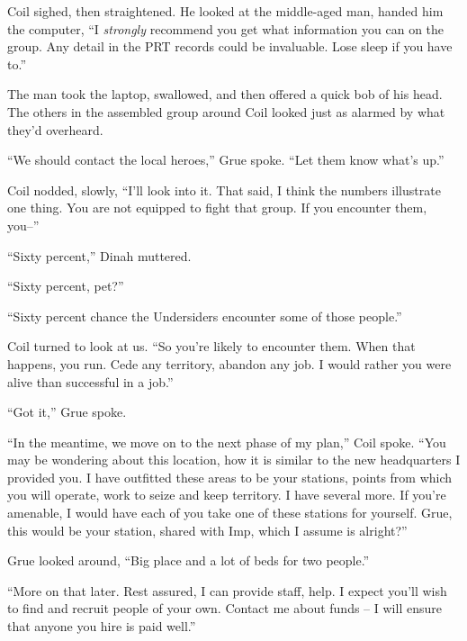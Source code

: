 Coil sighed, then straightened.  He looked at the middle-aged man, handed him the computer, ``I \emph{strongly} recommend you get what information you can on the group.  Any detail in the PRT records could be invaluable.  Lose sleep if you have to.''



The man took the laptop, swallowed, and then offered a quick bob of his head.  The others in the assembled group around Coil looked just as alarmed by what they'd overheard.



``We should contact the local heroes,'' Grue spoke.  ``Let them know what's up.''



Coil nodded, slowly, ``I'll look into it.  That said, I think the numbers illustrate one thing.  You are not equipped to fight that group.  If you encounter them, you--''



``Sixty percent,'' Dinah muttered.



``Sixty percent, pet?''



``Sixty percent chance the Undersiders encounter some of those people.''



Coil turned to look at us.  ``So you're likely to encounter them.  When that happens, you run.  Cede any territory, abandon any job.  I would rather you were alive than successful in a job.''



``Got it,'' Grue spoke.



``In the meantime, we move on to the next phase of my plan,'' Coil spoke.  ``You may be wondering about this location, how it is similar to the new headquarters I provided you.  I have outfitted these areas to be your stations, points from which you will operate, work to seize and keep territory.  I have several more.  If you're amenable, I would have each of you take one of these stations for yourself.  Grue, this would be your station, shared with Imp, which I assume is alright?''



Grue looked around, ``Big place and a lot of beds for two people.''



``More on that later.  Rest assured, I can provide staff, help.  I expect you'll wish to find and recruit people of your own.  Contact me about funds – I will ensure that anyone you hire is paid well.''



